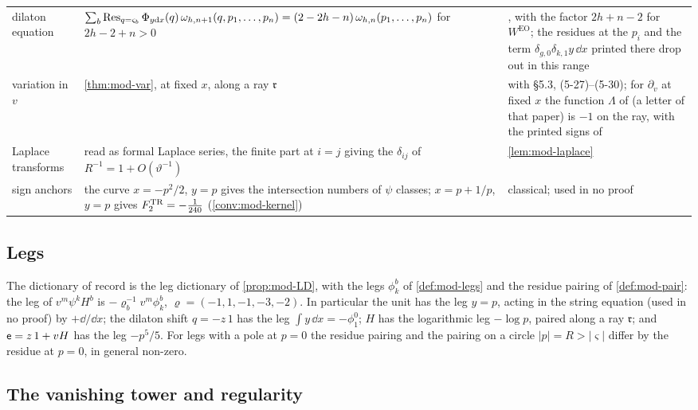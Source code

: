 \begin{table}[ht]
\begin{tabular}{@{}>{\raggedright\arraybackslash}p{}>{\raggedright\arraybackslash}p{}>{\raggedright\arraybackslash}p{}@{}}
dilaton equation & $\sum_b\operatorname*{Res}_{q=\varsigma_b}\Phi_{y\mathrm dx}(q)\,\omega_{h,n+1}(q,p_1,\dots,p_n)=(2-2h-n)\,\omega_{h,n}(p_1,\dots,p_n)$ for $2h-2+n>0$ & \cite[Theorem~4.7, (4-30)]{Eynard:2007kz}, with the factor $2h+n-2$ for $W^{\mathrm{EO}}$; the residues at the $p_i$ and the term $\delta_{g,0}\delta_{k,1}y\,\dd x$ printed there drop out in this range \\
variation in $v$ & \cref{thm:mod-var}, at fixed $x$, along a ray $\mathfrak r$ & \cite[Theorem~5.1, (5-14)]{Eynard:2007kz} with \S5.3, (5-27)--(5-30); for $\partial_v$ at fixed $x$ the function $\Lambda$ of \cite[(5-13)]{Eynard:2007kz} (a letter of that paper) is $-1$ on the ray, with the printed signs of \cite[(5-1), (5-13)]{Eynard:2007kz} \\
Laplace transforms & \cite[(2-31), (2-32)]{Dunin-Barkowski:2015caa} read as formal Laplace series, the finite part at $i=j$ giving the $\delta_{ij}$ of $R^{-1}=1+O(\vartheta^{-1})$ & \cref{lem:mod-laplace} \\
sign anchors & the curve $x=-p^2/2$, $y=p$ gives the intersection numbers of $\psi$ classes; $x=p+1/p$, $y=p$ gives $F^{\mathrm{TR}}_2=-\frac1{240}$ (\cref{conv:mod-kernel}) & classical; used in no proof \\
\hline
\end{tabular}
\end{table}

\subsection{Legs}
\label{sec:sgn-legs}

The dictionary of record is the leg dictionary of \cref{prop:mod-LD}, with the legs $\phi^b_k$ of \cref{def:mod-legs} and the residue pairing of \cref{def:mod-pair}: the leg of $v^m\psi^kH^b$ is $-\varrho_b^{-1}v^m\phi^b_k$, $\varrho=(-1,1,-1,-3,-2)$. In particular the unit has the leg $y=p$, acting in the string equation (used in no proof) by $+\dd/\dd x$; the dilaton shift $q=-z\,1$ has the leg $\int y\,\dd x=-\phi^0_1$; $H$ has the logarithmic leg $-\log p$, paired along a ray $\mathfrak r$; and $\mathsf{e}=z\,1+vH$ has the leg $-p^5/5$. For legs with a pole at $p=0$ the residue pairing and the pairing on a circle $|p|=R>|\varsigma|$ differ by the residue at $p=0$, in general non-zero.

\subsection{The vanishing tower and regularity}
\label{sec:sgn-tower}

